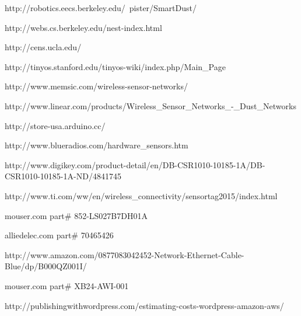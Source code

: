 \documentclass[ppfs.tex]{template/subfiles}
\begin{document}
\begin{thebibliography}{10}

http://robotics.eecs.berkeley.edu/~pister/SmartDust/

http://webs.cs.berkeley.edu/nest-index.html

http://cens.ucla.edu/

http://tinyos.stanford.edu/tinyos-wiki/index.php/Main\_Page

http://www.memsic.com/wireless-sensor-networks/

http://www.linear.com/products/Wireless\_Sensor\_Networks\_-\_Dust\_Networks

http://store-usa.arduino.cc/

http://www.blueradios.com/hardware\_sensors.htm

http://www.digikey.com/product-detail/en/DB-CSR1010-10185-1A/DB-CSR1010-10185-1A-ND/4841745

http://www.ti.com/ww/en/wireless\_connectivity/sensortag2015/index.html

mouser.com part# 852-LS027B7DH01A

alliedelec.com part# 70465426 

http://www.amazon.com/0877083042452-Network-Ethernet-Cable-Blue/dp/B000QZ001I/

mouser.com part# XB24-AWI-001

http://publishingwithwordpress.com/estimating-costs-wordpress-amazon-aws/
\end{thebibliography}
\end{document}
